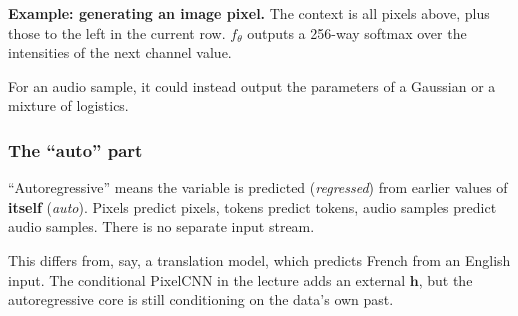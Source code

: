 \textbf{Example: generating an image pixel.} The context is all pixels above, plus those to the left in the current row. $f_\theta$ outputs a 256-way softmax over the intensities of the next channel value.

For an audio sample, it could instead output the parameters of a Gaussian or a mixture of logistics.

\subsubsection*{The ``auto'' part}

``Autoregressive'' means the variable is predicted (\textit{regressed}) from earlier values of \textbf{itself} (\textit{auto}). Pixels predict pixels, tokens predict tokens, audio samples predict audio samples. There is no separate input stream.

This differs from, say, a translation model, which predicts French from an English input. The conditional PixelCNN in the lecture adds an external $\mathbf{h}$, but the autoregressive core is still conditioning on the data's own past.